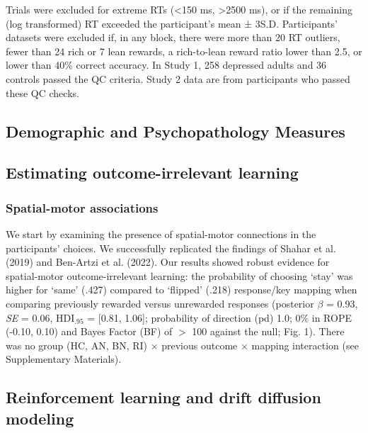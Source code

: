 \documentclass[
  man,floatsintext]{apa6}
\begin{document}
Trials were excluded for extreme RTs (\textless150 ms, \textgreater2500 ms), or if the remaining (log transformed) RT exceeded the participant's mean ± 3S.D. Participants' datasets were excluded if, in any block, there were more than 20 RT outliers, fewer than 24 rich or 7 lean rewards, a rich-to-lean reward ratio lower than 2.5, or lower than 40\% correct accuracy. In Study 1, 258 depressed adults and 36 controls passed the QC criteria. Study 2 data are from participants who passed these QC checks.

\hypertarget{demographic-and-psychopathology-measures}{%
\subsection{Demographic and Psychopathology Measures}\label{demographic-and-psychopathology-measures}}

\hypertarget{estimating-outcome-irrelevant-learning}{%
\subsection{Estimating outcome-irrelevant learning}\label{estimating-outcome-irrelevant-learning}}

\hypertarget{spatial-motor-associations}{%
\subsubsection{Spatial-motor associations}\label{spatial-motor-associations}}

We start by examining the presence of spatial-motor connections in the participants' choices. We successfully replicated the findings of Shahar et al. (2019) and Ben-Artzi et al. (2022). Our results showed robust evidence for spatial-motor outcome-irrelevant learning: the probability of choosing `stay' was higher for `same' (.427) compared to `flipped' (.218) response/key mapping when comparing previously rewarded versus unrewarded responses (posterior \(\beta\) = 0.93, \emph{SE} = 0.06, \(\text{HDI}_{.95}\) = {[}0.81, 1.06{]}; probability of direction (pd) 1.0; 0\% in ROPE (-0.10, 0.10) and Bayes Factor (BF) of \(>\) 100 against the null; Fig. 1). There was no group (HC, AN, BN, RI) \(\times\) previous outcome \(\times\) mapping interaction (see Supplementary Materials).

\hypertarget{reinforcement-learning-and-drift-diffusion-modeling}{%
\subsection{Reinforcement learning and drift diffusion modeling}\label{reinforcement-learning-and-drift-diffusion-modeling}}
\end{document}
